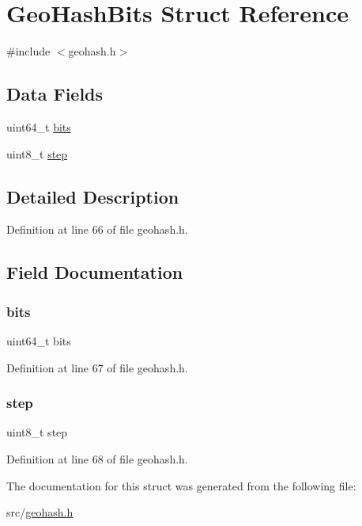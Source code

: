 \hypertarget{struct_geo_hash_bits}{}\section{Geo\+Hash\+Bits Struct Reference}
\label{struct_geo_hash_bits}


{\ttfamily \#include $<$geohash.\+h$>$}

\subsection*{Data Fields}
\begin{DoxyCompactItemize}
\item 
uint64\+\_\+t \hyperlink{struct_geo_hash_bits_a824af546b997aeefcb71a5fe0eda3a0a}{bits}
\item 
uint8\+\_\+t \hyperlink{struct_geo_hash_bits_a4a2eb71e89c989655301c2f2070e29b3}{step}
\end{DoxyCompactItemize}


\subsection{Detailed Description}


Definition at line 66 of file geohash.\+h.



\subsection{Field Documentation}
\mbox{\label{struct_geo_hash_bits_a824af546b997aeefcb71a5fe0eda3a0a}} 
\subsubsection{\texorpdfstring{bits}{bits}}
{\footnotesize\ttfamily uint64\+\_\+t bits}



Definition at line 67 of file geohash.\+h.

\mbox{\label{struct_geo_hash_bits_a4a2eb71e89c989655301c2f2070e29b3}} 
\subsubsection{\texorpdfstring{step}{step}}
{\footnotesize\ttfamily uint8\+\_\+t step}



Definition at line 68 of file geohash.\+h.



The documentation for this struct was generated from the following file\+:\begin{DoxyCompactItemize}
\item 
src/\hyperlink{geohash_8h}{geohash.\+h}\end{DoxyCompactItemize}
